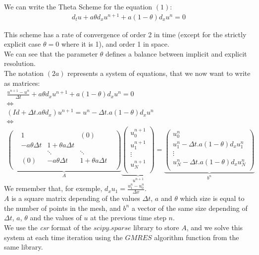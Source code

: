 \documentclass[12pt]{article}
\begin{document}
\vspace{8pt}
We can write the Theta Scheme for the equation $(1)$:
\begin{align*}
    d_t u + a\theta d_x u^{n+1} + a(1-\theta) d_x u^n = 0 \tag{2a}
\end{align*}


This scheme has a rate of convergence of order 2 in time (except for the strictly explicit case $\theta=0$ where it is 1), and order 1 in space.\\
We can see that the parameter $\theta$ defines a balance between implicit and explicit resolution.\\
The notation $(2a)$ represents a system of equations, that we now want to write as matrices: \\

\[
\begin{array}{c}
\displaystyle \frac{u^{n+1} - u^n}{\Delta t} + a\theta d_x u^{n+1} + a(1-\theta) d_x u^n = 0 \\
\Leftrightarrow \\
\displaystyle (Id + \Delta t . a \theta d_x)u^{n+1} = u^n - \Delta t .a(1-\theta)d_x u^n \\
\Leftrightarrow \\

\underbrace{
    \begin{pmatrix}
    & 1 & & (0) &\\
    & -a\theta\Delta t & 1+\theta a \Delta t & & \\
    & & \ddots & \ddots \\
    & (0) & -a\theta\Delta t & 1+\theta a \Delta t \\
    \end{pmatrix}
}_{\text{$A$}}

\underbrace{
    \begin{pmatrix}
    u_0^{n+1}\\
    u_1^{n+1}\\
    \vdots \\
    u_N^{n+1}\\
    \end{pmatrix}
}_{\text{$u^{n+1}$}}
=
\underbrace{
    \begin{pmatrix}
    u_0^n\\
    u_1^n - \Delta t .a(1-\theta)d_x u_1^n\\
    \vdots \\
    u_{N}^n - \Delta t .a(1-\theta)d_x u_{N}^n\\
    \end{pmatrix}
}_{b^n} \tag{2b}
\end{array}
\]
We remember that, for exemple, $d_x u_1 = \frac{u_1^n - u_0^n}{\Delta x}$.\\
$A$ is a square matrix depending of the values $\Delta t$, $a$ and $\theta$ which size is equal to the number of points in the mesh,
and $b^n$ a vector of the same size depending of $\Delta t$, $a$, $\theta$ and the values of $u$ at the previous time step $n$.\\
We use the \textit{csr} format of the $scipy.sparse$ library to store $A$, and we solve this system at each time iteration using the $GMRES$ algorithm function from the same library. 
\end{document}
